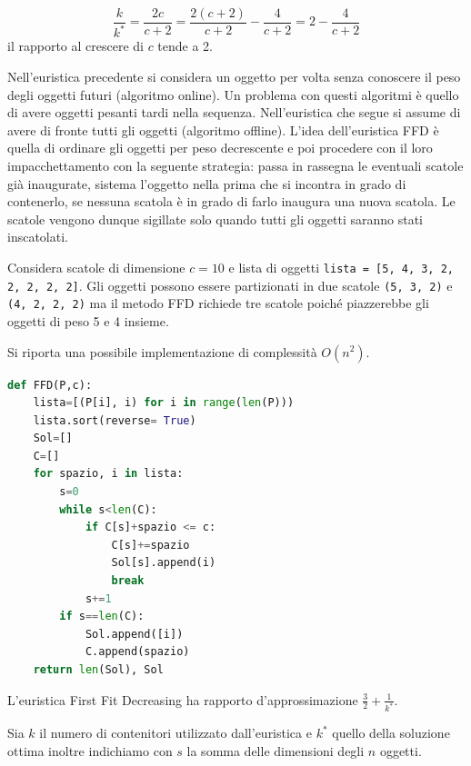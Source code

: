 \begin{equation*}
    \frac{k}{k^*}=\frac{2c}{c+2}=\frac{2(c+2)}{c+2}-\frac{4}{c+2}=2-\frac{4}{c+2}
\end{equation*}
il rapporto al crescere di $c$ tende a 2.

Nell'euristica precedente si considera un oggetto per volta senza conoscere il peso degli oggetti futuri (algoritmo online). Un problema con questi algoritmi è quello di avere oggetti pesanti tardi nella sequenza. Nell'euristica che segue si assume di avere di fronte tutti gli oggetti (algoritmo offline). L'idea dell'euristica FFD è quella di ordinare gli oggetti per peso decrescente e poi procedere con il loro impacchettamento con la seguente strategia: passa in rassegna le eventuali scatole già inaugurate, sistema l'oggetto nella prima che si incontra in grado di contenerlo, se nessuna scatola è in grado di farlo inaugura una nuova scatola. Le scatole vengono dunque sigillate solo quando tutti gli oggetti saranno stati inscatolati.

Considera scatole di dimensione $c = 10$ e lista di oggetti \texttt{lista = [5, 4, 3, 2, 2, 2, 2, 2]}. Gli oggetti possono essere partizionati in due scatole \texttt{(5, 3, 2)} e \texttt{(4, 2, 2, 2)} ma il metodo FFD richiede tre scatole poiché piazzerebbe gli oggetti di peso 5 e 4
insieme. 

Si riporta una possibile implementazione di complessità $O(n^2)$.

\begin{lstlisting}[language=Python]
def FFD(P,c):
    lista=[(P[i], i) for i in range(len(P)))
    lista.sort(reverse= True)
    Sol=[]
    C=[]
    for spazio, i in lista:
        s=0
        while s<len(C):
            if C[s]+spazio <= c:
                C[s]+=spazio
                Sol[s].append(i)
                break
            s+=1
        if s==len(C):
            Sol.append([i])
            C.append(spazio)
    return len(Sol), Sol
\end{lstlisting}
L'euristica First Fit Decreasing ha rapporto d'approssimazione $\frac{3}{2}+\frac{1}{k^*}$.

Sia $k$ il numero di contenitori utilizzato dall'euristica e $k^*$ quello della soluzione ottima inoltre indichiamo con $s$ la somma delle dimensioni degli $n$ oggetti.

